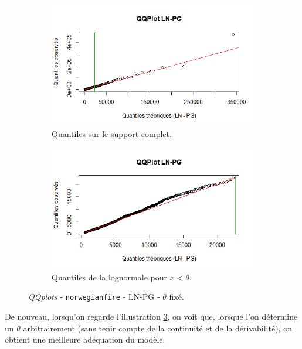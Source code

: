 		\begin{figure}[H]
			\begin{center}
				\begin{subfigure}[b]{0.45\textwidth}
					\includegraphics[scale=0.54]{Graphiques/QQ_LN_PG_choix} 
					\caption{Quantiles sur le support complet.} \label{QQplot_LN_PG_choix}
				\end{subfigure}
				\begin{subfigure}[b]{0.4\textwidth}
					\includegraphics[scale=0.54]{Graphiques/QQ_LN_PG_choix_t1} 
					\caption{Quantiles de la lognormale pour $x<\theta$.} \label{QQplot_LN_PG_choix_2}
				\end{subfigure}
				\renewcommand{\figurename}{Illustration}
				\caption{\textit{QQplots} - \texttt{norwegianfire} - LN-PG - $\theta$ fixé.}
			\end{center}
		\end{figure}
		
		De nouveau, lorsqu'on regarde l'illustration \ref{QQplot_LN_PG_choix_2}, on voit que, lorsque l'on détermine un $\theta$ arbitrairement (sans tenir compte de la continuité et de la dérivabilité), on obtient une meilleure adéquation du modèle.
		
